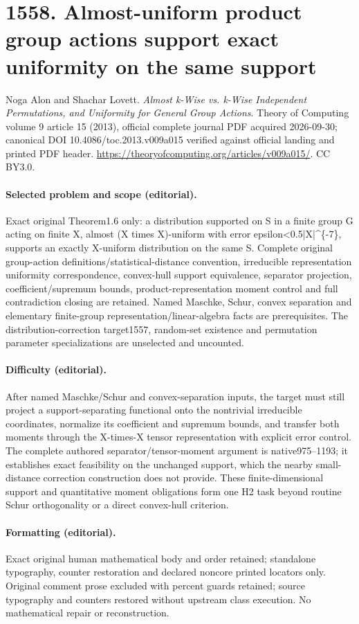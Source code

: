 \documentclass[10pt]{article}
\theoremstyle{definition}
\numberwithin{equation}{section}
\begin{document}
\begingroup\raggedright
\section*{1558. Almost-uniform product group actions support exact uniformity on the same support}
Noga Alon and Shachar Lovett. \emph{Almost k-Wise vs. k-Wise Independent Permutations, and Uniformity for General Group Actions}. Theory of Computing volume 9 article 15 (2013), official complete journal PDF acquired 2026-09-30; canonical DOI 10.4086/toc.2013.v009a015 verified against official landing and printed PDF header. \url{https://theoryofcomputing.org/articles/v009a015/}. CC BY3.0.
\paragraph{Selected problem and scope (editorial).} Exact original Theorem1.6 only: a distribution supported on S in a finite group G acting on finite X, almost (X times X)-uniform with error epsilon<0.5|X|\textasciicircum{}\{-7\}, supports an exactly X-uniform distribution on the same S. Complete original group-action definitions/statistical-distance convention, irreducible representation uniformity correspondence, convex-hull support equivalence, separator projection, coefficient/supremum bounds, product-representation moment control and full contradiction closing are retained. Named Maschke, Schur, convex separation and elementary finite-group representation/linear-algebra facts are prerequisites. The distribution-correction target1557, random-set existence and permutation parameter specializations are unselected and uncounted.
\paragraph{Difficulty (editorial).} After named Maschke/Schur and convex-separation inputs, the target must still project a support-separating functional onto the nontrivial irreducible coordinates, normalize its coefficient and supremum bounds, and transfer both moments through the X-times-X tensor representation with explicit error control. The complete authored separator/tensor-moment argument is native975–1193; it establishes exact feasibility on the unchanged support, which the nearby small-distance correction construction does not provide. These finite-dimensional support and quantitative moment obligations form one H2 task beyond routine Schur orthogonality or a direct convex-hull criterion.
\paragraph{Formatting (editorial).} Exact original human mathematical body and order retained; standalone typography, counter restoration and declared noncore printed locators only. Original comment prose excluded with percent guards retained; source typography and counters restored without upstream class execution. No mathematical repair or reconstruction.
\end{document}
